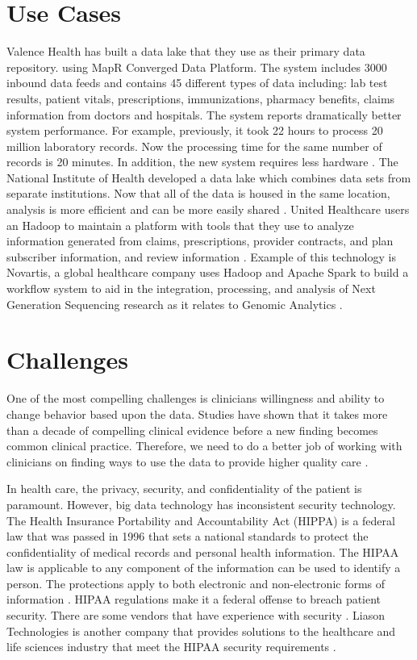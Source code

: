 \documentclass[sigconf]{acmart}
\begin{document}
{{ \section{Use Cases}
Valence Health has built a data lake that they use as their primary data repository. using MapR Converged Data Platform. The system includes 3000 inbound data feeds and contains 45 different types of data including:  lab test results, patient vitals, prescriptions, immunizations, pharmacy benefits, claims information from doctors and hospitals. The system reports dramatically better system performance. For example, previously, it took 22 hours to process 20 million laboratory records. Now the processing time for the same number of records is 20 minutes. In addition, the new system requires less hardware \cite{www-google-McDonald}. 
The National Institute of Health developed a data lake which combines data sets from separate institutions. Now that all of the data is housed in the same location, analysis is more efficient and can be more easily shared \cite{www-google-McDonald}.
United Healthcare users an Hadoop to maintain a platform with tools that they use to analyze information generated from claims, prescriptions, provider contracts, and plan subscriber information, and review information \cite{www-google-McDonald}.
Example of this technology is Novartis, a global healthcare company uses Hadoop and Apache Spark to build a workflow system to aid in the integration, processing, and analysis of Next Generation Sequencing research as it relates to Genomic Analytics \cite{www-google-McDonald}.


\section{Challenges}
One of the most compelling challenges is clinicians willingness and ability to change behavior based upon the data.  Studies have shown that it takes more than a decade of compelling clinical evidence before a new finding becomes common clinical practice. Therefore, we need to do a better job of working with clinicians on finding ways to use the data to provide higher quality care \cite{www-google-hadoop}. 

 In health care, the privacy, security, and confidentiality of the patient is paramount. However, big data technology has inconsistent security technology.  The Health Insurance Portability and Accountability Act (HIPPA) is a federal law that was passed in 1996 that sets a national standards to protect the confidentiality of medical records and personal health information. The HIPAA law is applicable to any component of the information can be used to identify a person. The protections apply to both electronic and non-electronic forms of information \cite{HIPAA}. HIPAA regulations make it a federal offense to breach patient security.  There are some vendors that have experience with security \cite{HlthCat}. Liason Technologies is another company that provides solutions to the healthcare and life sciences industry that meet the HIPAA security requirements \cite{www-google-McDonald}.
 
}}
\end{document}
